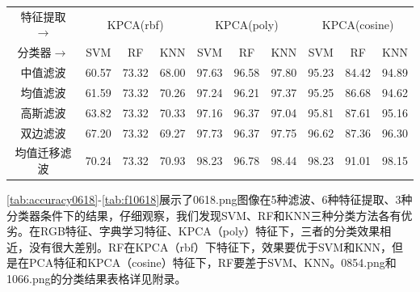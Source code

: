 \documentclass[12pt,hyperref,a4paper,UTF8]{ctexart}
\begin{document}
{\begin{table}[!h]
\begin{tabular}{@{}clllllllll@{}}
		\hline
		特征提取$\rightarrow$    & \multicolumn{3}{c}{KPCA(rbf)}                                              & \multicolumn{3}{c}{KPCA(poly)}                                             & \multicolumn{3}{c}{KPCA(cosine)}                                           \\
		分类器$\rightarrow$     & \multicolumn{1}{c}{SVM} & \multicolumn{1}{c}{RF} & \multicolumn{1}{c}{KNN} & \multicolumn{1}{c}{SVM} & \multicolumn{1}{c}{RF} & \multicolumn{1}{c}{KNN} & \multicolumn{1}{c}{SVM} & \multicolumn{1}{c}{RF} & \multicolumn{1}{c}{KNN} \\
		\hline
		中值滤波                 & 60.57                   & 73.32                  & 68.00                   & 97.63                   & 96.58                  & 97.80                   & 95.23                   & 84.42                  & 94.89                   \\
		均值滤波                 & 61.59                   & 73.32                  & 70.26                   & 97.24                   & 96.21                  & 97.37                   & 95.25                   & 86.68                  & 94.62                   \\
		高斯滤波                 & 63.82                   & 73.32                  & 70.33                   & 97.16                   & 96.37                  & 97.04                   & 95.81                   & 87.61                  & 95.16                   \\
		双边滤波                 & 67.20                   & 73.32                  & 69.27                   & 97.73                   & 96.37                  & 97.75                   & 96.62                   & 87.36                  & 96.30                   \\
		均值迁移滤波               & 70.24                   & 73.32                  & 70.93                   & 98.23                   & 96.78                  & 98.44                   & 98.23                   & 91.01                  & 98.15                  \\
		\hline
	\end{tabular}
\end{table}


\par
\autoref{tab:accuracy0618}-\ref{tab:f10618}展示了0618.png图像在5种滤波、6种特征提取、3种分类器条件下的结果，仔细观察，我们发现SVM、RF和KNN三种分类方法各有优劣。在RGB特征、字典学习特征、KPCA（poly）特征下，三者的分类效果相近，没有很大差别。RF在KPCA（rbf）下特征下，效果要优于SVM和KNN，但是在PCA特征和KPCA（cosine）特征下，RF要差于SVM、KNN。0854.png和1066.png的分类结果表格详见附录。


}
\end{document}
